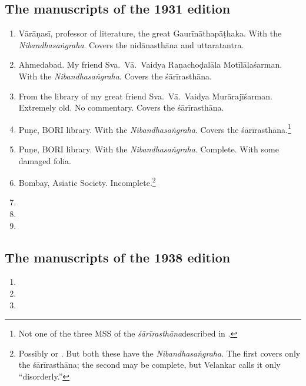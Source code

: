 \documentclass[12pt]{article}
\begin{document}
        \subsection{The manuscripts of the 1931 edition}

\begin{enumerate}

    \item[1] Vārāṇasī, professor of literature, the great Gaurīnāthapāṭhaka.  With the 
    \emph{Nibandhasaṅgraha}. Covers the nidānasthāna and uttaratantra.
 
    \item [2]  Ahmedabad.  My friend Sva.\ Vā.\ Vaidya Raṇachoḍalāla Motīlālaśarman.  
    With the \emph{Nibandhasaṅgraha}.  Covers the śārīrasthāna.
    
    \item [3] From the library of my great friend Sva.\ Vā.\ Vaidya Murārajīśarman.  
    Extremely old. No commentary.  Covers the śārīrasthāna. 
    
    \item [4]  Puṇe, BORI library.  With the \emph{Nibandhasaṅgraha}. Covers the
śārīrasthāna.\footnote{Not one of the three MSS of the
\emph{śārīrasthāna}described in \cite{shar-vaid}.}
    
    \item [5]  Puṇe, BORI library.  With the \emph{Nibandhasaṅgraha}. Complete.  
    With some damaged folia.
    
    \item [6]  Bombay, Asiatic Society.  Incomplete.\footnote{Possibly  or  \citep[v.\,1, \# 212 and 
    213]{vela-1930}.  But both these have the \emph{Nibandhasaṅgraha}.  The first 
    covers only the śārīrasthāna; the second may be complete, but Velankar calls it 
    only “disorderly.”}
    
    \item [7] 
    
    \item [8]
    
    \item [9]

\end{enumerate}
  
     
       
        \subsection{The manuscripts of the 1938 edition}
        \begin{enumerate}
    \item [1]
            \item[2]
            
            \item [3]
        \end{enumerate}
    
\end{document}
